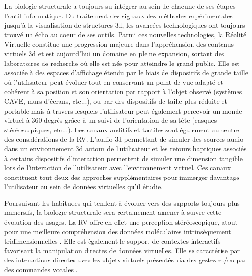 La biologie structurale a toujours su intégrer au sein de chacune de ses étapes l'outil informatique. Du traitement des signaux des méthodes expérimentales jusqu'à la visualisation de structures 3d, les avancées technologiques ont toujours trouvé un écho au coeur de ses outils.
Parmi ces nouvelles technologies, la Réalité Virtuelle constitue une progression majeure dans l'appréhension des contenus virtuels 3d et est aujourd'hui un domaine en pleine expansion, sortant des laboratoires de recherche où elle est née pour atteindre le grand public.
Elle est associée à des espaces d'affichage étendu par le biais de dispositifs de grande taille où l'utilisateur peut évoluer tout en conservant un point de vue adapté et cohérent à sa position et son orientation par rapport à l'objet observé (systèmes CAVE, murs d'écrans, etc...), ou par des dispositifs de taille plus réduite et portable mais à travers lesquels l'utilisateur peut également percevoir un monde virtuel à 360 degrés grâce à un suivi de l'orientation de sa tête (casques stéréoscopiques, etc...). Les canaux auditifs et tactiles sont également au centre des considérations de la RV. L'audio 3d permettant de simuler des sources audio dans un environnement 3d autour de l'utilisateur et les retours haptiques associés à certains dispositifs d'interaction permettent de simuler une dimension tangible lors de l'interaction de l'utilisateur avec l'environnement virtuel. Ces canaux constituent tout deux des approches supplémentaires pour immerger davantage l'utilisateur au sein de données virtuelles qu'il étudie.

Poursuivant les habitudes qui tendent à évoluer vers des supports toujours plus immersifs, la biologie structurale sera certainement amener à suivre cette évolution des usages. 
La RV offre en effet une perception stéréoscopique, atout pour une meilleure compréhension des données moléculaires intrinsèquement tridimensionnelles \cite{van2000immersive,stone_immersive_2010,odonoghue_visualization_2010}. Elle est également le support de contextes interactifs favorisant la manipulation directes de données virtuelles. Elle se caractérise par des interactions directes avec les objets virtuels présentés via des gestes et/ou par des commandes vocales \cite{bowman2001design}.

